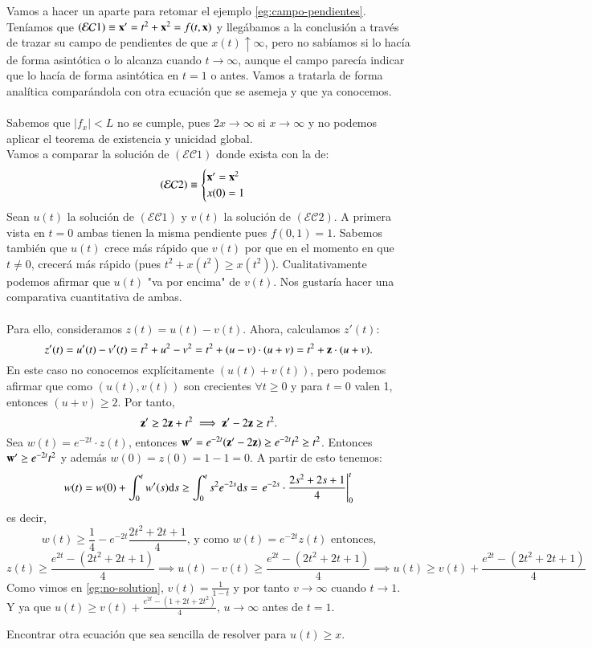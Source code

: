 \begin{eg}
Vamos a hacer un aparte para retomar el ejemplo \ref{eg:campo-pendientes}. Teníamos que $(\mathcal{EC}1) \equiv \mathbf{x}' = t^2 + \mathbf{x}^2 = f(t, \mathbf{x})$ y llegábamos a la conclusión a través de trazar su campo de pendientes de que $x(t) \uparrow \infty$, pero no sabíamos si lo hacía de forma asintótica o lo alcanza cuando $t \to \infty$, aunque el campo parecía indicar que lo hacía de forma asintótica en $t=1$ o antes. Vamos a tratarla de forma analítica comparándola con otra ecuación que se asemeja y que ya conocemos.\\\\
Sabemos que $|f_x| < L$ no se cumple, pues $2x \to \infty$ si $x \to \infty$ y no podemos aplicar el teorema de existencia y unicidad global.\\
Vamos a comparar la solución de $(\mathcal{EC}1)$ donde exista con la de:
$$
    (\mathcal{EC}2)\equiv
    \begin{cases}
        \mathbf{x}' = \mathbf{x}^2\\
        x(0) = 1
    \end{cases}
$$
Sean $u(t)$ la solución de $(\mathcal{EC}1)$ y $v(t)$ la solución de $(\mathcal{EC}2)$. A primera vista en $t=0$ ambas tienen la misma pendiente pues $f(0,1) = 1$.
Sabemos también que $u(t)$ crece más rápido que $v(t)$ por que en el momento en que $t \neq 0$, crecerá más rápido (pues $t^2 + x(t^2) \geq x(t^2)$). Cualitativamente podemos afirmar que $u(t)$ "va por encima" de $v(t)$. Nos gustaría hacer una comparativa cuantitativa de ambas.\\\\
Para ello, consideramos $z(t) = u(t) - v(t)$. Ahora, calculamos $z'(t)$:
$$
    z'(t) =  u'(t) - v'(t) = t^2+u^2-v^2 = t^2 + (u - v)\cdot(u + v) = t^2 + \mathbf{z}\cdot(u + v).
$$
En este caso no conocemos explícitamente $(u(t)+v(t))$, pero podemos afirmar que como $(u(t),v(t))$ son crecientes $\forall t\geq0$ y para $t=0$ valen 1, entonces $(u + v) \geq 2$. Por tanto,
$$
    \mathbf{z}' \geq 2\mathbf{z} + t^2 \implies \mathbf{z}' - 2\mathbf{z}\geq t^2.
$$
Sea $w(t) = e^{-2t}\cdot z(t)$, entonces $\mathbf{w}' = e^{-2t}(\mathbf{z}'-2\mathbf{z}) \geq e^{-2t}t^2 \geq t^2$. Entonces $\mathbf{w}' \geq e^{-2t}t^2$ y además $w(0) = z(0) = 1 - 1 = 0$. A partir de esto tenemos:
$$ %
    w(t) = w(0) + \int_0^t w'(s) \d s \geq \int_0^t s^2 e^{-2s} \d s = \left.e^{-2s} \cdot \frac{2s^2 + 2s + 1}{4}\right|_0^t
$$
es decir,
$$
    w(t) \geq \frac{1}{4} - e^{-2t} \frac{2t^2 + 2t + 1}{4} \text{, y como } w(t) = e^{-2t} z(t) \text{ entonces,}
$$
$$
    z(t) \geq \frac{e^{2t} - (2t^2 + 2t + 1) }{4} \implies u(t) - v(t) \geq \frac{e^{2t} - (2t^2 + 2t + 1) }{4} \implies u(t) \geq v(t) + \frac{e^{2t} - (2t^2 + 2t + 1) }{4}
$$
Como vimos en \ref{eg:no-solution}, $v(t) = \frac{1}{1-t}$ y por tanto $v \to \infty$ cuando $t \to 1$. Y ya que $u(t) \geq v(t) + \frac{e^{2t} - (1 + 2t + 2t^2)}{4}$, $u \to \infty$ antes de $t = 1$.
\end{eg}
\begin{th_ex} %
    Encontrar otra ecuación que sea sencilla de resolver para $u(t) \geq x$.
\end{th_ex}

